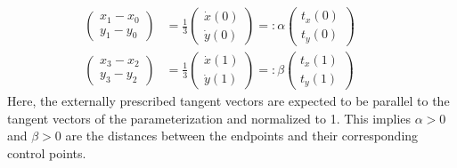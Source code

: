 \documentclass{article}
\begin{document}
\begin{align}
  \left(\begin{array}{cc}
    x_1-x_0 \\ y_1-y_0
  \end{array}\right)
  &= \frac{1}{3}
  \left(\begin{array}{cc}
    \dot x(0) \\ \dot y(0)
  \end{array}\right)
  =: \alpha
  \left(\begin{array}{cc}
    t_x(0) \\ t_y(0)
  \end{array}\right) \\
  \left(\begin{array}{cc}
    x_3-x_2 \\ y_3-y_2
  \end{array}\right)
  &= \frac{1}{3}
  \left(\begin{array}{cc}
    \dot x(1) \\ \dot y(1)
  \end{array}\right)
  =: \beta
  \left(\begin{array}{cc}
    t_x(1) \\ t_y(1)
  \end{array}\right) \qquad
\end{align}
\endgroup
%
Here, the externally prescribed tangent vectors are expected to be parallel to
the tangent vectors of the parameterization and normalized to 1. This implies
$\alpha>0$ and $\beta>0$ are the distances between the endpoints and their
corresponding control points.
\end{document}
